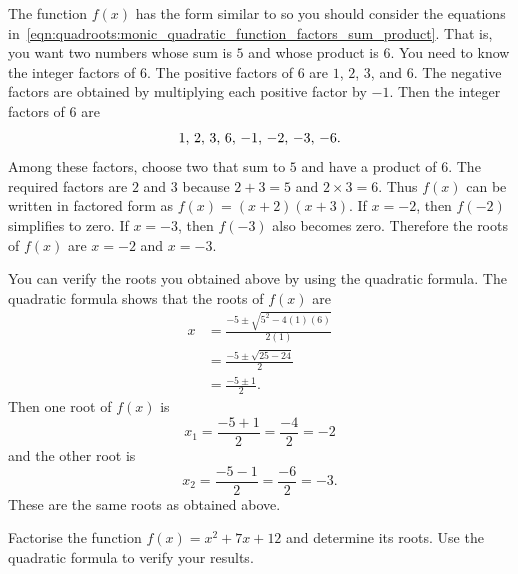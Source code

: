 \documentclass[a4paper,oneside,12pt]{article}
\begin{document}
\begin{solution}
The function $f(x)$ has the form similar to
 so you should
consider the equations
in~\eqref{eqn:quadroots:monic_quadratic_function_factors_sum_product}.
That is, you want two numbers whose sum is $5$ and whose product is
$6$.  You need to know the integer factors of $6$.  The positive
factors of $6$ are $1$, $2$, $3$, and $6$.  The negative factors are
obtained by multiplying each positive factor by $-1$.  Then the
integer factors of $6$ are
\[
{1},\, {2},\, {3},\, {6},\, {-1},\, {-2},\, {-3},\, {-6}.
\]
Among these factors, choose two that sum to $5$ and have a product of
$6$.  The required factors are $2$ and $3$ because $2 + 3 = 5$ and
$2 \times 3 = 6$.  Thus $f(x)$ can be written in factored form as
$f(x) = (x + 2) (x + 3)$.  If $x = -2$, then $f(-2)$ simplifies to
zero.  If $x = -3$, then $f(-3)$ also becomes zero.  Therefore the
roots of $f(x)$ are $x = -2$ and $x = -3$.

You can verify the roots you obtained above by using the quadratic
formula.  The quadratic formula shows that the roots of $f(x)$ are
\begin{align*}
x
&=
\frac{
  -5
  \pm
  \sqrt{
    5^2 - 4(1)(6)
  }
}{
  2(1)
} \\[4pt]
&=
\frac{
  -5
  \pm
  \sqrt{
    25 - 24
  }
}{
  2
} \\[4pt]
&=
\frac{
  -5 \pm 1
}{
  2
}.
\end{align*}
Then one root of $f(x)$ is
\[
x_1
=
\frac{-5 + 1}{2}
=
\frac{-4}{2}
=
-2
\]
and the other root is
\[
x_2
=
\frac{-5 - 1}{2}
=
\frac{-6}{2}
=
-3.
\]
These are the same roots as obtained above.
\end{solution}

\begin{exercise}
Factorise the function $f(x) = x^2 + 7x + 12$ and determine its
roots.  Use the quadratic formula to verify your results.
\end{exercise}

\end{document}
